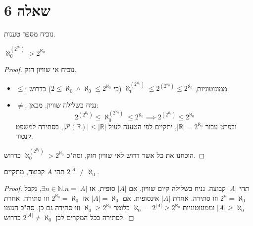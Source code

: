 \documentclass[]{article}
\newcommand\N     {\mathbb{N}}
\newcommand\R     {\mathbb{R}}
\newcommand\ps    {\mathcal{P}}
\newcommand\az    {\aleph_0}
\newcommand\taz   {2^{\aleph_0}}
\newcommand\utaz  { ^{\left (2^{\aleph_0} \right )}}
\begin{document}
	\section*{שאלה 6}
	נוכיח מספר טענות. 
	\begin{hebenum}
		\item $ \az^{\left (\taz \right )} > \taz $ \begin{proof}
			נוכיח אי שוויון חזק. 
		\begin{itemize}
			\item $ \le $: ממונוטוניות, $ \az \utaz \le 2\utaz \le \taz $ (כי $ 2 \le \az \land \az \le \taz $) כדרוש. 
			\item $ \neq $: נניח בשלילה שוויון. מכאן: 
			\[ 2\utaz \le \az\utaz \le \taz \implies 2\utaz \le \taz \]
			ובפרט עבור $ |\R| = \taz $, יתקיים לפי הטענה לעיל $ |\ps(\R)| \le |\R| $, בסתירה למשפט קנטור. 
		\end{itemize}
		הוכחנו את כל אשר דרוש לאי שוויון חזק, וסה"כ $ \az\utaz > \taz $ כדרוש. 
		\end{proof}
		\item תהי $ A $ קבוצה, מתקיים $ 2^{|A|} \neq \az $. \begin{proof}
					תהי $ |A| $ קבוצה. נניח בשלילה קיום שוויון. אם $ |A| $ סופית, אז $ \exists n \in \N. n = |A| $, נקבל $ 2^n = \az $ וזו סתירה. אחרת $ |A| $ אינסופית. אם $ |A| = \az $ אז $ \taz = \az $ וזו סתירה. אחרת $ |A| \ge \az $ וממונוטוניות $ \az = 2^{|A|} \ge \taz $ כלומר $ \az \ge \taz $ וזו סתירה גם כן. סה"כ הגענו לסתירה בכל המקרים לכן $ 2^{|A|} \neq \az $ כדרוש. 
		\end{proof}
	\end{hebenum}
\end{document}
